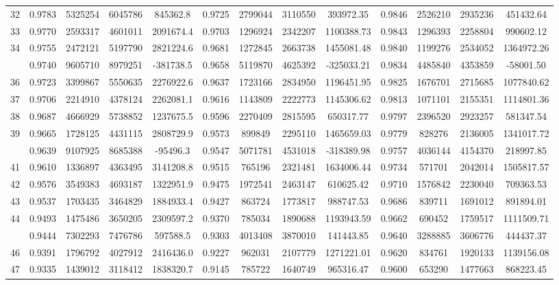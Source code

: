 \documentclass[
  12pt,
]{article}
\begin{document}
\begin{longtable}[t]{lcccccccccccc}
32 & 0.9783 & 5325254 & 6045786 & 845362.8 & 0.9725 & 2799044 & 3110550 & 393972.35 & 0.9846 & 2526210 & 2935236 & 451432.64\\
33 & 0.9770 & 2593317 & 4601011 & 2091674.4 & 0.9703 & 1296924 & 2342207 & 1100388.73 & 0.9843 & 1296393 & 2258804 & 990602.12\\
34 & 0.9755 & 2472121 & 5197790 & 2821224.6 & 0.9681 & 1272845 & 2663738 & 1455081.48 & 0.9840 & 1199276 & 2534052 & 1364972.26\\
\addlinespace
35 & 0.9740 & 9605710 & 8979251 & -381738.5 & 0.9658 & 5119870 & 4625392 & -325033.21 & 0.9834 & 4485840 & 4353859 & -58001.50\\
36 & 0.9723 & 3399867 & 5550635 & 2276922.6 & 0.9637 & 1723166 & 2834950 & 1196451.95 & 0.9825 & 1676701 & 2715685 & 1077840.62\\
37 & 0.9706 & 2214910 & 4378124 & 2262081.1 & 0.9616 & 1143809 & 2222773 & 1145306.62 & 0.9813 & 1071101 & 2155351 & 1114801.36\\
38 & 0.9687 & 4666929 & 5738852 & 1237675.5 & 0.9596 & 2270409 & 2815595 & 650317.77 & 0.9797 & 2396520 & 2923257 & 581347.54\\
39 & 0.9665 & 1728125 & 4431115 & 2808729.9 & 0.9573 & 899849 & 2295110 & 1465659.03 & 0.9779 & 828276 & 2136005 & 1341017.72\\
\addlinespace
40 & 0.9639 & 9107925 & 8685388 & -95496.3 & 0.9547 & 5071781 & 4531018 & -318389.98 & 0.9757 & 4036144 & 4154370 & 218997.85\\
41 & 0.9610 & 1336897 & 4363495 & 3141208.8 & 0.9515 & 765196 & 2321481 & 1634006.44 & 0.9734 & 571701 & 2042014 & 1505817.57\\
42 & 0.9576 & 3549383 & 4693187 & 1322951.9 & 0.9475 & 1972541 & 2463147 & 610625.42 & 0.9710 & 1576842 & 2230040 & 709363.53\\
43 & 0.9537 & 1703435 & 3464829 & 1884933.4 & 0.9427 & 863724 & 1773817 & 988747.53 & 0.9686 & 839711 & 1691012 & 891894.01\\
44 & 0.9493 & 1475486 & 3650205 & 2309597.2 & 0.9370 & 785034 & 1890688 & 1193943.59 & 0.9662 & 690452 & 1759517 & 1111509.71\\
\addlinespace
45 & 0.9444 & 7302293 & 7476786 & 597588.5 & 0.9303 & 4013408 & 3870010 & 141443.85 & 0.9640 & 3288885 & 3606776 & 444437.37\\
46 & 0.9391 & 1796792 & 4027912 & 2416436.0 & 0.9227 & 962031 & 2107779 & 1271221.01 & 0.9620 & 834761 & 1920133 & 1139156.08\\
47 & 0.9335 & 1439012 & 3118412 & 1838320.7 & 0.9145 & 785722 & 1640749 & 965316.47 & 0.9600 & 653290 & 1477663 & 868223.45\\

\end{longtable}
\end{document}
